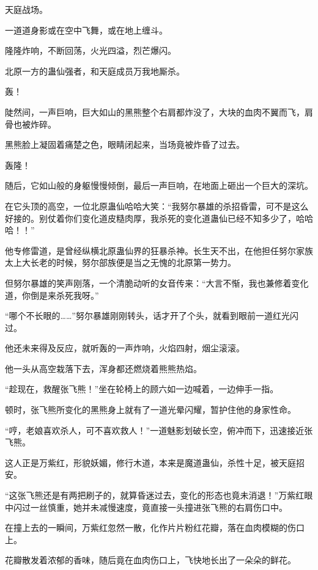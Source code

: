 
\begin{this_body}



天庭战场。

一道道身影或在空中飞舞，或在地上缠斗。

隆隆炸响，不断回荡，火光四溢，烈芒爆闪。

北原一方的蛊仙强者，和天庭成员万我地厮杀。

轰！

陡然间，一声巨响，巨大如山的黑熊整个右肩都炸没了，大块的血肉不翼而飞，肩骨也被炸碎。

黑熊脸上凝固着痛楚之色，眼睛闭起来，当场竟被炸昏了过去。

轰隆！

随后，它如山般的身躯慢慢倾倒，最后一声巨响，在地面上砸出一个巨大的深坑。

在它头顶的高空，一位北原蛊仙哈哈大笑：“我努尔暴雄的杀招昏雷，可不是这么好接的。别仗着你们变化道皮糙肉厚，我杀死的变化道蛊仙已经不知多少了，哈哈哈！！”

他专修雷道，是曾经纵横北原蛊仙界的狂暴杀神。长生天不出，在他担任努尔家族太上大长老的时候，努尔部族便是当之无愧的北原第一势力。

但努尔暴雄的笑声刚落，一个清脆动听的女音传来：“大言不惭，我也兼修着变化道，你倒是来杀死我呀。”

“哪个不长眼的……”努尔暴雄刚刚转头，话才开了个头，就看到眼前一道红光闪过。

他还未来得及反应，就听轰的一声炸响，火焰四射，烟尘滚滚。

他一头从高空栽落下去，浑身都还燃烧着熊熊热焰。

“趁现在，救醒张飞熊！”坐在轮椅上的顾六如一边喊着，一边伸手一指。

顿时，张飞熊所变化的黑熊身上就有了一道光晕闪耀，暂护住他的身家性命。

“哼，老娘喜欢杀人，可不喜欢救人！”一道魅影划破长空，俯冲而下，迅速接近张飞熊。

这人正是万紫红，形貌妖媚，修行木道，本来是魔道蛊仙，杀性十足，被天庭招安。

“这张飞熊还是有两把刷子的，就算昏迷过去，变化的形态也竟未消退！”万紫红眼中闪过一丝慎重，她并未减慢速度，竟直接一头撞进张飞熊的右肩伤口中。

在撞上去的一瞬间，万紫红忽然一散，化作片片粉红花瓣，落在血肉模糊的伤口上。

花瓣散发着浓郁的香味，随后竟在血肉伤口上，飞快地长出了一朵朵的鲜花。


\end{this_body}
